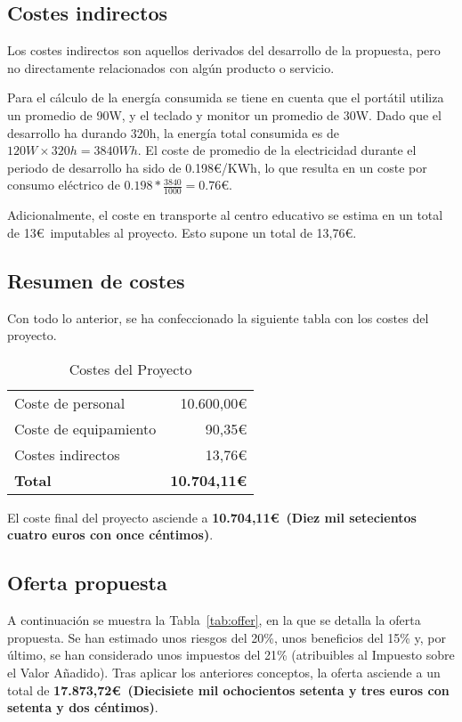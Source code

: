 \subsection{Costes indirectos}\label{subsec:indirect-cost}
Los costes indirectos son aquellos derivados del desarrollo de la propuesta, pero no directamente relacionados con algún producto o servicio.

Para el cálculo de la energía consumida se tiene en cuenta que el portátil utiliza un promedio de 90W, y el teclado y monitor un promedio de 30W. Dado que el desarrollo ha durando 320h, la energía total consumida es de $120W\times 320h = 3840Wh$. El coste de promedio de la electricidad durante el periodo de desarrollo ha sido de 0.198\euro/KWh, lo que resulta en un coste por consumo eléctrico de $0.198*\frac{3840}{1000} = 0.76$\euro.

Adicionalmente, el coste en transporte al centro educativo se estima en un total de 13\euro~imputables al proyecto. Esto supone un total de 13,76\euro.

\subsection{Resumen de costes}
Con todo lo anterior, se ha confeccionado la siguiente tabla con los costes del proyecto.

\begin{table}[H]
    \begin{tabular}{@{}lr@{}}
        \toprule
        Coste de personal & 10.600,00\euro\\
        Coste de equipamiento & 90,35\euro\\
        Costes indirectos & 13,76\euro\\ \midrule
        \textbf{Total} & \textbf{10.704,11\euro}\\
        \bottomrule
    \end{tabular}
    \caption{Costes del Proyecto}\label{tab:resumen-costes}
\end{table}

El coste final del proyecto asciende a \textbf{10.704,11\euro~(Diez mil setecientos cuatro euros con once céntimos)}.

\subsection{Oferta propuesta}\label{subsec:offer}

A continuación se muestra la Tabla~\ref{tab:offer}, en la que se detalla la oferta propuesta. Se han estimado unos riesgos del 20\%, unos beneficios del 15\% y, por último, se han considerado unos impuestos del 21\% (atribuibles al Impuesto sobre el Valor Añadido). Tras aplicar los anteriores conceptos, la oferta asciende a un total de \textbf{17.873,72\euro~(Diecisiete mil ochocientos setenta y tres euros con setenta y dos céntimos)}.

